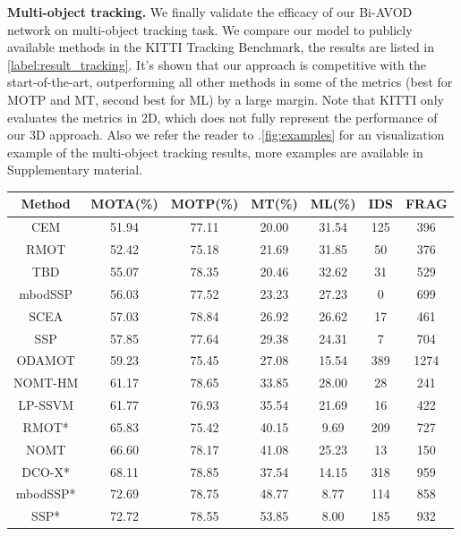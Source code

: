 \documentclass{bmvc2k}
\begin{document}
\textbf{Multi-object tracking.} We finally validate the efficacy of our Bi-AVOD network on multi-object tracking task. We compare our model to publicly available methods in the KITTI Tracking Benchmark, the results are listed in \tablename \, \ref{label:result_tracking}. It's shown that our approach is competitive with the start-of-the-art, outperforming all other methods in some of the metrics (best for MOTP and MT, second best for ML) by a large margin. Note that KITTI only evaluates the metrics in 2D, which does not fully represent the performance of our 3D approach. Also we refer the reader to \figurename .\ref{fig:examples} for an visualization example of the multi-object tracking results, more examples are available in Supplementary material.
\begin{table}[]\centering
	\footnotesize
	\begin{tabular}{ccccccc}
		\toprule[1.5pt]
		Method        & MOTA(\%) & MOTP(\%) & MT(\%) & ML(\%) & IDS & FRAG \\ \midrule
		CEM           & 51.94    & 77.11    & 20.00  & 31.54  & 125 & 396  \\
		RMOT          & 52.42    & 75.18    & 21.69  & 31.85  & 50  & 376  \\
		TBD           & 55.07    & 78.35    & 20.46  & 32.62  & 31  & 529  \\
		mbodSSP       & 56.03    & 77.52    & 23.23  & 27.23  & 0   & 699  \\
		SCEA          & 57.03    & 78.84    & 26.92  & 26.62  & 17  & 461  \\
		SSP           & 57.85    & 77.64    & 29.38  & 24.31  & 7   & 704  \\
		ODAMOT        & 59.23    & 75.45    & 27.08  & 15.54  & 389 & 1274 \\
		NOMT-HM       & 61.17    & 78.65    & 33.85  & 28.00  & 28  & 241  \\
		LP-SSVM       & 61.77    & 76.93    & 35.54  & 21.69  & 16  & 422  \\
		RMOT*         & 65.83    & 75.42    & 40.15  & 9.69   & 209 & 727  \\
		NOMT          & 66.60    & 78.17    & 41.08  & 25.23  & 13  & 150  \\
		DCO-X*        & 68.11    & 78.85    & 37.54  & 14.15  & 318 & 959  \\
		mbodSSP*      & 72.69    & 78.75    & 48.77  & 8.77   & 114 & 858  \\
		SSP*          & 72.72    & 78.55    & 53.85  & 8.00   & 185 & 932  \\

\end{tabular}
\end{table}
\end{document}
